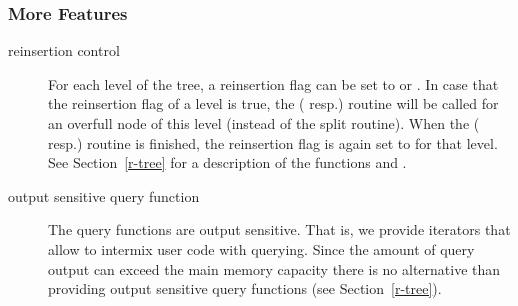 \subsubsection{More Features}
\begin{description}
\item[reinsertion control]
For each level of the tree, a reinsertion flag can be set to  
or . In case that the reinsertion flag of a level is
true, the  ( resp.)
routine will be called for an overfull node of this level (instead 
of the split routine). When the 
( resp.) routine is finished, the
reinsertion flag is again set to  for that level.
See Section~\ref{r-tree} for a description 
of the functions  and .
\item[output sensitive query function]
The query functions are output sensitive. That is, we
provide iterators that allow to intermix user code with
querying. Since the amount of query output can exceed
the main memory capacity there is no alternative than providing
output sensitive query functions (see Section~\ref{r-tree}).
\end{description}



